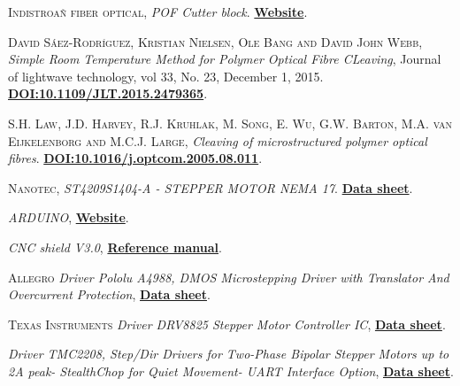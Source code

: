 \begin{thebibliography}{100}
 \textsc{Indistroañ fiber optical},
\textit{POF Cutter block}. \href{https://i-fiberoptics.com/tool-detail.php?id=105&cat=cutters}{\textbf{Website}}.

 \textsc{David Sáez-Rodríguez, Kristian Nielsen, Ole Bang and David John Webb},
\textit{Simple Room Temperature Method for Polymer Optical Fibre CLeaving}, Journal of lightwave technology, vol 33, No. 23, December 1, 2015. \href{https://ieeexplore.ieee.org/document/7274313}{\textbf{DOI:10.1109/JLT.2015.2479365}}.

 \textsc{S.H. Law, J.D. Harvey, R.J. Kruhlak, M. Song, E. Wu, G.W. Barton, M.A. van Eijkelenborg and M.C.J. Large},
\textit{Cleaving of microstructured polymer optical fibres}. \href{https://www.researchgate.net/publication/228880071_Cleaving_of_microstructured_polymer_optical_fibres}{\textbf{DOI:10.1016/j.optcom.2005.08.011}}.

 \textsc{Nanotec},
\textit{ST4209S1404-A - STEPPER MOTOR NEMA 17}. \href{https://en.nanotec.com/products/463-st4209s1404-a}{\textbf{Data sheet}}.

\textit{ARDUINO}, \href{https://www.arduino.cc/}{\textbf{Website}}.

\textit{CNC shield V3.0}, \href{https://osoyoo.com/2017/04/07/arduino-uno-cnc-shield-v3-0-a4988/}{\textbf{Reference manual}}.

 \textsc{Allegro}
\textit{Driver Pololu A4988, DMOS Microstepping Driver with Translator And Overcurrent Protection}, \href{https://www.alldatasheet.es/datasheet-pdf/pdf/455036/ALLEGRO/A4988.html}{\textbf{Data sheet}}.

 \textsc{Texas Instruments}
\textit{Driver DRV8825 Stepper Motor Controller IC}, \href{https://www.ti.com/product/DRV8825?utm_source=google&utm_medium=cpc&utm_campaign=asc-null-null-GPN_EN-cpc-pf-google-wwe&utm_content=DRV8825&ds_k=DRV8825+Datasheet&DCM=yes&gclid=EAIaIQobChMIworWtYba7gIVqoFQBh10_QfhEAAYASAAEgLPn_D_BwE&gclsrc=aw.ds}{\textbf{Data sheet}}.

\textit{Driver TMC2208, Step/Dir Drivers for Two-Phase Bipolar Stepper Motors up to 2A peak- StealthChop for Quiet Movement- UART Interface Option}, \href{https://datasheetspdf.com/pdf/1142008/TRINAMIC/TMC2225/1}{\textbf{Data sheet}}.


\end{thebibliography}

